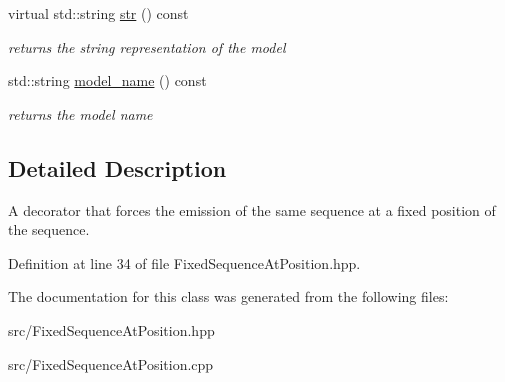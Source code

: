 \begin{DoxyCompactItemize}
virtual std\+::string \hyperlink{classtops_1_1FixedSequenceAtPosition_a55c81be8635c092f980689e7fa723998}{str} () const
\begin{DoxyCompactList}\small\item\em returns the string representation of the model \end{DoxyCompactList}\item 
\mbox{\label{classtops_1_1FixedSequenceAtPosition_acc3c6985dbd22612f13e0a7e1f485c2d}} 
std\+::string \hyperlink{classtops_1_1FixedSequenceAtPosition_acc3c6985dbd22612f13e0a7e1f485c2d}{model\+\_\+name} () const
\begin{DoxyCompactList}\small\item\em returns the model name \end{DoxyCompactList}\end{DoxyCompactItemize}


\subsection{Detailed Description}
A decorator that forces the emission of the same sequence at a fixed position of the sequence. 

Definition at line 34 of file Fixed\+Sequence\+At\+Position.\+hpp.



The documentation for this class was generated from the following files\+:\begin{DoxyCompactItemize}
\item 
src/Fixed\+Sequence\+At\+Position.\+hpp\item 
src/Fixed\+Sequence\+At\+Position.\+cpp\end{DoxyCompactItemize}
